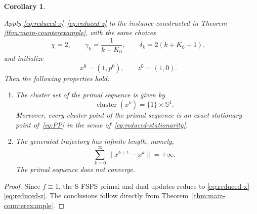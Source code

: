 \documentclass[11pt]{article}
\numberwithin{equation}{section}
\newtheorem{remark}[theorem]{Remark}
\newtheorem{corollary}[theorem]{Corollary}
\begin{document}
\begin{corollary}\label{cor:counterexample-consequences}

Apply \eqref{eq:reduced-x}--\eqref{eq:reduced-z}  to the instance constructed in Theorem
\ref{thm:main-counterexample}, with the same choices
\[
    \chi=2,\qquad
    \gamma_k=\frac{1}{k+K_0},\qquad
    \delta_k=2(k+K_0+1),
\]
and initialize
\[
    x^0=(1,p^0),\qquad z^0=(1,0).
\]
Then the following properties hold:
\begin{enumerate}[label=\textup{(\roman*)}]
\item The cluster set of the primal sequence is given by
\[
    \operatorname{cluster}(x^k)
    =
    \{1\}\times\mathbb S^1 .
\]
Moreover, every cluster point of the primal sequence is an exact stationary point of~\eqref{eq:PP} in the sense of~\eqref{eq:reduced-stationarity}.

\item The generated trajectory has infinite length, namely,
\[
    \sum_{k=0}^{\infty}\|x^{k+1}-x^k\|
    =
    +\infty .
\]
The primal sequence does not converge.

\end{enumerate}
\end{corollary}
\begin{proof}
Since \(f\equiv1\), the S-FSPS primal and dual updates reduce to
\eqref{eq:reduced-x}--\eqref{eq:reduced-z}.
The conclusions  follow directly from Theorem~\ref{thm:main-counterexample}.
\end{proof}
\end{document}
